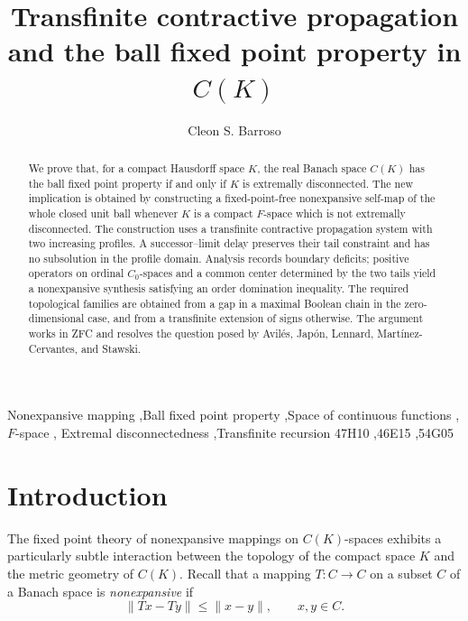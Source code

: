 \documentclass[preprint,12pt,nopreprintline]{elsarticle}
\theoremstyle{definition}
\theoremstyle{remark}
\numberwithin{equation}{section}
\begin{document}
\begin{frontmatter}

\title{Transfinite contractive propagation and the ball fixed point property in \texorpdfstring{$C(K)$}{C(K)}}
\author{Cleon S. Barroso}
 \address{Department of Mathematics\\ Federal University of Ceará, Fortaleza, 60455-360, CE, Brazil}

\begin{abstract}
We prove that, for a compact Hausdorff space $K$, the real Banach space $C(K)$ has the ball fixed point property if and only if $K$ is extremally disconnected. The new implication is obtained by constructing a fixed-point-free nonexpansive self-map of the whole closed unit ball whenever $K$ is a compact $F$-space which is not extremally disconnected. The construction uses a transfinite contractive propagation system with two increasing profiles. A successor--limit delay preserves their tail constraint and has no subsolution in the profile domain. Analysis records boundary deficits; positive operators on ordinal $C_0$-spaces and a common center determined by the two tails yield a nonexpansive synthesis satisfying an order domination inequality. The required topological families are obtained from a gap in a maximal Boolean chain in the zero-dimensional case, and from a transfinite extension of signs otherwise. The argument works in ZFC and resolves the question posed by Avil\'es, Jap\'on, Lennard, Mart\'inez-Cervantes, and Stawski.
\end{abstract}

\begin{keyword}
Nonexpansive mapping \sep Ball fixed point property \sep Space of continuous functions \sep $F$-space \sep
Extremal disconnectedness \sep Transfinite recursion
\MSC[2020] 47H10 \sep 46E15 \sep 54G05
\end{keyword}

\end{frontmatter}

\section{Introduction}
\label{sec:int}

The fixed point theory of nonexpansive mappings on \(C(K)\)-spaces exhibits a particularly subtle interaction between the topology of the compact space \(K\) and the metric geometry of \(C(K)\). Recall that a mapping $T:C\to C$ on a subset \(C\) of a Banach space is \emph{nonexpansive} if
\[
\|Tx-Ty\|\leq \|x-y\|,\qquad x,y\in C.
\]
\end{document}
